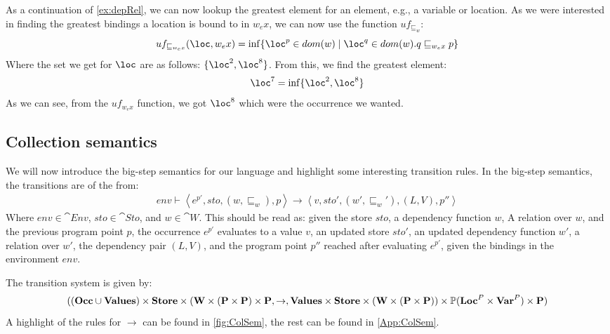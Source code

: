 \documentclass[../../master.tex]{subfiles}
\begin{document}
\begin{example}[]\label{ex:deplookup}
	As a continuation of \cref{ex:depRel}, we can now lookup the greatest element for an element, e.g., a variable or location.
	As we were interested in finding the greatest bindings a location is bound to in $w_ex$, we can now use the function $uf_{\sqsubseteq_w}$:
	$$uf_{\sqsubseteq_{w_ex}}(\loc,w_ex)=\inf\{\loc^p\in dom(w)\mid \loc^q\in dom(w). q\sqsubseteq_{w_ex} p\}$$
	Where the set we get for $\loc$ are as follows: $\{\loc^2,\loc^8\}$.
	From this, we find the greatest element:
	$$\loc^7=\inf\{\loc^2,\loc^8\}$$
	As we can see, from the $uf_{w_ex}$ function, we got $\loc^8$ which were the occurrence we wanted.
\end{example}

\subsection{Collection semantics}\label{sec:sem}
We will now introduce the big-step semantics for our language and highlight some interesting transition rules.
In the big-step semantics, the transitions are of the from:
\begin{align*}
env\vdash\left\langle e^{p'},sto,(w,\sqsubseteq_w),p\right\rangle\rightarrow\left\langle v,sto',(w',\sqsubseteq_w'),(L,V),p''\right\rangle
\end{align*}
Where $env\in\cat{Env}$, $sto\in\cat{Sto}$, and $w\in\cat{W}$.
This should be read as: given the store $sto$, a dependency function $w$, A relation over $w$, and the previous program point $p$, the occurrence $e^{p'}$ evaluates to a value $v$, an updated store $sto'$, an updated dependency function $w'$, 
a relation over $w'$, the dependency pair $(L,V)$, and the program point $p''$ reached after evaluating $e^{p'}$, given the bindings in the environment $env$.

The transition system is given by:
$$((\textbf{Occ}\cup\textbf{Values})\times\textbf{Store}\times(\textbf{W}\times(\textbf{P}\times\textbf{P})\times\textbf{P},\rightarrow,
\textbf{Values}\times\textbf{Store}\times(\textbf{W}\times(\textbf{P}\times\textbf{P}))\times\mathbb{P}(\textbf{Loc}^P\times\textbf{Var}^P)\times\textbf{P})$$
A highlight of the rules for $\rightarrow$ can be found in \cref{fig:ColSem}, the rest can be found in \cref{App:ColSem}.
\end{document}
